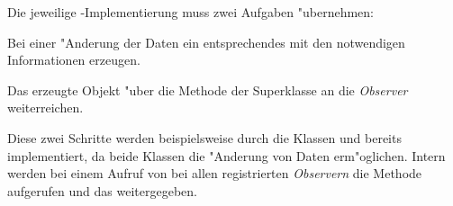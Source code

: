 Die jeweilige -Implementierung muss zwei Aufgaben "ubernehmen:
\begin{enumerate}
	{%
	\renewcommand{\theenumi}{\arabic{enumi}}
	\renewcommand{\labelenumi}{{\theenumi}.}
	\item Bei einer "Anderung der Daten ein entsprechendes  mit den notwendigen Informationen erzeugen.
	\item Das erzeugte Objekt "uber die Methode  der Superklasse  an die \emph{Observer} weiterreichen.
	}
\end{enumerate}
Diese zwei Schritte werden beispielsweise durch die Klassen  und  bereits implementiert, da beide Klassen die "Anderung von Daten erm"oglichen.
Intern werden bei einem Aufruf von  bei allen registrierten \emph{Observern} die Methode  aufgerufen und das  weitergegeben.



